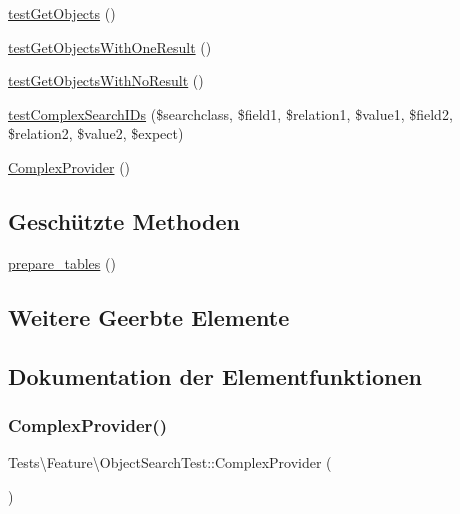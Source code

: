 \begin{DoxyCompactItemize}
\item 
\hyperlink{classTests_1_1Feature_1_1ObjectSearchTest_a94c94229d705a2b79761d0c78545777a}{test\+Get\+Objects} ()
\item 
\hyperlink{classTests_1_1Feature_1_1ObjectSearchTest_ad498afb2f20f0c8be10db0e604f2e89a}{test\+Get\+Objects\+With\+One\+Result} ()
\item 
\hyperlink{classTests_1_1Feature_1_1ObjectSearchTest_aff914e07ce5c98b447a3ffa2d0bd47cc}{test\+Get\+Objects\+With\+No\+Result} ()
\item 
\hyperlink{classTests_1_1Feature_1_1ObjectSearchTest_ad5a70b64273331fbf8fcb999f13aa0ee}{test\+Complex\+Search\+I\+Ds} (\$searchclass, \$field1, \$relation1, \$value1, \$field2, \$relation2, \$value2, \$expect)
\item 
\hyperlink{classTests_1_1Feature_1_1ObjectSearchTest_ab90f587d88a002b0434ae1b491a48b8c}{Complex\+Provider} ()
\end{DoxyCompactItemize}
\subsection*{Geschützte Methoden}
\begin{DoxyCompactItemize}
\item 
\hyperlink{classTests_1_1Feature_1_1ObjectSearchTest_a8c2e171c9ee08cd8f413ba2764446d3f}{prepare\+\_\+tables} ()
\end{DoxyCompactItemize}
\subsection*{Weitere Geerbte Elemente}


\subsection{Dokumentation der Elementfunktionen}
\mbox{\label{classTests_1_1Feature_1_1ObjectSearchTest_ab90f587d88a002b0434ae1b491a48b8c}} 
\subsubsection{\texorpdfstring{Complex\+Provider()}{ComplexProvider()}}
{\footnotesize\ttfamily Tests\textbackslash{}\+Feature\textbackslash{}\+Object\+Search\+Test\+::\+Complex\+Provider (\begin{DoxyParamCaption}{ }\end{DoxyParamCaption})}

